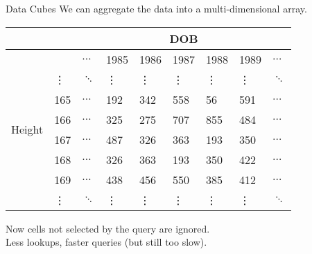 \documentclass{beamer}
\theoremstyle{definition}
\theoremstyle{definition}
\begin{document}
\begin{frame}{Data Cubes}
    We can aggregate the data into a multi-dimensional array.\cite{Gray96}

    \begin{table}[h]\footnotesize
        \begin{tabular} { | l | l | l | l | l | l | l | l | l |}
        \hline
        & & \multicolumn{7}{|c|}{DOB} \\ \hline
        & & $\hdots$ & 1985 & 1986 & 1987 & 1988 & 1989 & $\hdots$ \\ \hline
        \multirow{6}{*}{Height}
        & \vdots & $\ddots$ & \vdots & \vdots & \vdots & \vdots & \vdots & $\ddots$ \\
        & 165 & $\hdots$ & 192 & 342 & 558 & 56 & 591 & $\hdots$ \\
        & 166 & $\hdots$ & 325 & 275 & 707 & 855 & 484 & $\hdots$ \\
        & 167 & $\hdots$ & 487 & 326 & 363 & 193 & 350 & $\hdots$ \\
        & 168 & $\hdots$ & 326 & 363 & 193 & 350 & 422 & $\hdots$ \\
        & 169 & $\hdots$ & 438 & 456 & 550 & 385 & 412 & $\hdots$ \\
        & \vdots & $\ddots$ & \vdots & \vdots & \vdots & \vdots & \vdots & $\ddots$ \\
        \hline
        \end{tabular}
    \end{table}

    Now cells not selected by the query are ignored. \\
    Less lookups, faster queries (but still too slow).
\end{frame}
\end{document}
